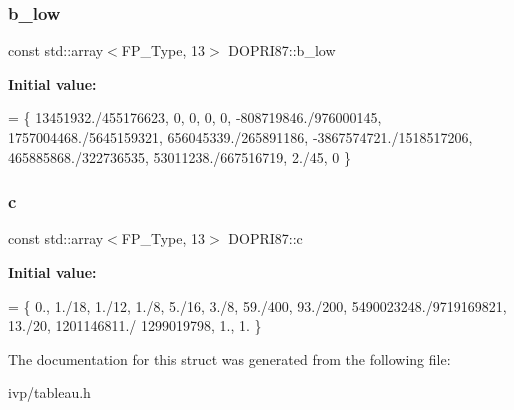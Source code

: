 \subsubsection{\texorpdfstring{b\+\_\+low}{b\_low}}
{\footnotesize\ttfamily const std\+::array$<$F\+P\+\_\+\+Type, 13$>$ D\+O\+P\+R\+I87\+::b\+\_\+low}

{\bfseries Initial value\+:}
\begin{DoxyCode}
= \{
     13451932./455176623, 0, 0, 0, 0, -808719846./976000145, 1757004468./5645159321, 656045339./265891186, 
        -3867574721./1518517206,   465885868./322736535,  53011238./667516719, 2./45, 0
   \}
\end{DoxyCode}
\mbox{\label{structDOPRI87_a4920ff4638ecba0061800d7c456d920d}} 
\subsubsection{\texorpdfstring{c}{c}}
{\footnotesize\ttfamily const std\+::array$<$F\+P\+\_\+\+Type, 13$>$ D\+O\+P\+R\+I87\+::c}

{\bfseries Initial value\+:}
\begin{DoxyCode}
= \{
    0., 1./18, 1./12, 1./8, 5./16, 3./8, 59./400, 93./200, 5490023248./9719169821, 13./20, 1201146811./
      1299019798, 1., 1.
  \}
\end{DoxyCode}


The documentation for this struct was generated from the following file\+:\begin{DoxyCompactItemize}
\item 
ivp/tableau.\+h\end{DoxyCompactItemize}
